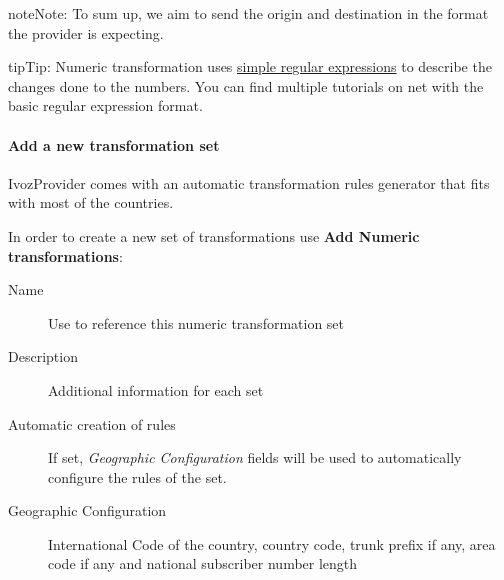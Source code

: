 \documentclass[letterpaper,10pt,english]{sphinxmanual}
\begin{document}
\begin{notice}{note}{Note:}
To sum up, we aim to send the origin and destination in the format the
provider is expecting.
\end{notice}

\begin{notice}{tip}{Tip:}
Numeric transformation uses \href{https://es.wikipedia.org/wiki/Expresi\%C3\%B3n\_regular}{simple regular expressions} to describe the
changes done to the numbers. You can find multiple tutorials on net with the
basic regular expression format.
\end{notice}


\paragraph{Add a new transformation set}
\label{administration_portal/brand/settings/numeric_transformations:add-a-new-transformation-set}
IvozProvider comes with an automatic transformation rules generator that fits
with most of the countries.

In order to create a new set of transformations use \textbf{Add Numeric transformations}:
\begin{description}
\item[{Name}] \leavevmode{}\label{administration_portal/brand/settings/numeric_transformations:term-name}
Use to reference this numeric transformation set

\item[{Description}] \leavevmode{}\label{administration_portal/brand/settings/numeric_transformations:term-description}
Additional information for each set

\item[{Automatic creation of rules}] \leavevmode{}\label{administration_portal/brand/settings/numeric_transformations:term-automatic-creation-of-rules}
If set, \emph{Geographic Configuration} fields will be used to automatically configure the rules of the set.

\item[{Geographic Configuration}] \leavevmode{}\label{administration_portal/brand/settings/numeric_transformations:term-geographic-configuration}
International Code of the country, country code, trunk prefix if any, area code if any and national subscriber
number length

\end{description}
\end{document}
